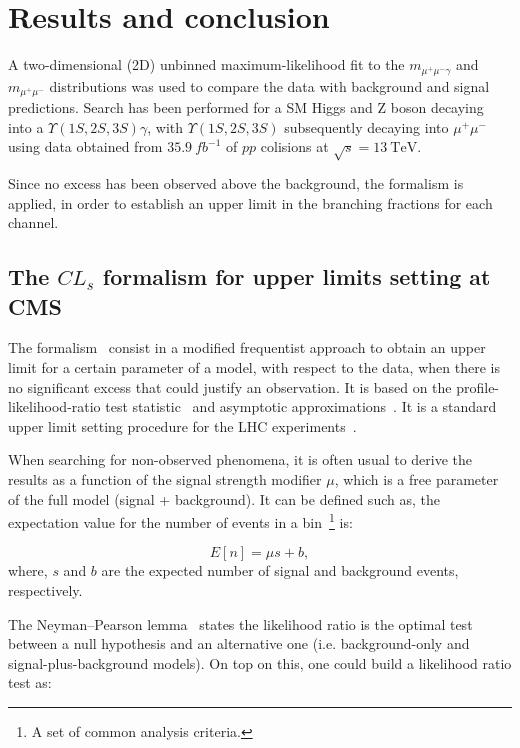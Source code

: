 \section{Results and conclusion}
\label{chaper_results}

A two-dimensional (2D) unbinned maximum-likelihood fit to the $m_{\mu^{+}\mu^{-}\gamma}$ and $m_{\mu^{+}\mu^{-}}$ distributions was used to compare the data with background and signal predictions. Search has been performed for a SM Higgs and $\mathrm{Z}$ boson decaying into a $\Upsilon(1S,2S,3S)\gamma$, with $\Upsilon(1S,2S,3S)$ subsequently decaying into $\mu^{+}\mu^{-}$ using data obtained from $35.9~fb^{-1}$ of $pp$ colisions at $\sqrt{s}=13~\mathrm{TeV}$. 

Since no excess has been observed above the background, the \CLs formalism is applied, in order to establish an upper limit in the branching fractions for each channel.

\subsection{The $CL_{s}$ formalism for upper limits setting at CMS}
\label{sec:cls}

The \CLs formalism~\cite{cls_Read_2002} consist in a modified frequentist approach to obtain an upper limit for a certain parameter of a model, with respect to the data, when there is no significant excess that could justify an observation. It is based on the profile-likelihood-ratio test statistic~\cite{profiled_lh} and asymptotic approximations~\cite{asymptotic_cls}. It is a standard upper limit setting procedure for the LHC experiments~\cite{CMS-NOTE-2011-005}.

When searching for non-observed phenomena, it is often usual to derive the results as a function of the signal strength modifier $\mu$, which is a free parameter of the full model (signal + background). It can be defined such as, the expectation value for the number of events in a bin~\footnote{A set of common analysis criteria.} is:


\begin{equation}
\label{eqn:signal_strength}
E[n] = \mu s + b,
\end{equation}
where, $s$ and $b$ are the expected number of signal and background events, respectively.

The Neyman–Pearson lemma~\cite{profiled_lh} states the likelihood ratio is the optimal test between a null hypothesis and an alternative one (i.e. background-only and signal-plus-background models). On top on this, one could build a likelihood ratio test as:


